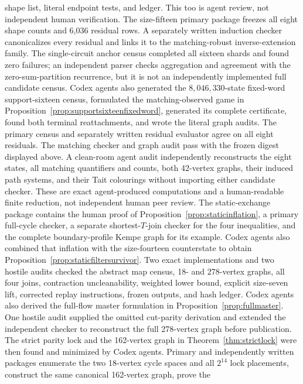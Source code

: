\documentclass[11pt]{article}
\theoremstyle{definition}
\theoremstyle{remark}
\begin{document}
shape list, literal endpoint tests, and ledger.  This too is agent
review, not independent human verification.  The
size-fifteen primary package freezes
all eight shape counts and 6,036 residual rows.  A separately written
induction checker canonicalizes every residual and links it to the
matching-robust inverse-extension family.  The single-circuit anchor
census completed all sixteen shards and found zero failures; an
independent parser checks aggregation and agreement with the
zero-sum-partition recurrence, but it is not an independently implemented
full candidate census.
Codex agents also generated the \(8{,}046{,}330\)-state fixed-word
support-sixteen census, formulated the matching-observed game in
Proposition~\ref{prop:supportsixteenfixedword}, generated its complete
certificate, found both terminal reattachments, and wrote the literal
graph audits.  The primary census and separately written residual
evaluator agree on all eight residuals.  The matching checker and graph
audit pass with the frozen digest displayed above.  A clean-room agent
audit independently reconstructs the eight states, all matching
quantifiers and counts, both 42-vertex graphs, their induced path systems,
and their Tait colourings without importing either candidate checker.
These are exact
agent-produced computations and a human-readable finite reduction, not
independent human peer review.
The static-exchange package contains the human proof of
Proposition~\ref{prop:staticinflation}, a primary full-cycle checker, a
separate shortest-\(T\)-join checker for the four inequalities, and the
complete boundary-profile Kempe graph for its example.
Codex agents also combined that inflation with the size-fourteen
counterstate to obtain Proposition~\ref{prop:staticfiltersurvivor}.
Two exact implementations and two hostile audits checked the abstract
map census, 18- and 278-vertex graphs, all four joins, contraction
uncleanability, weighted lower bound, explicit size-seven lift, corrected
replay instructions, frozen outputs, and hash ledger.
Codex agents also derived the full-flow master formulation in
Proposition~\ref{prop:fullmaster}.  One hostile audit supplied the omitted
cut-parity derivation and extended the independent checker to reconstruct
the full 278-vertex graph before publication.  The strict parity lock and
the 162-vertex graph in Theorem~\ref{thm:strictlock} were then found and
minimized by Codex agents.  Primary and independently written packages
enumerate the two 18-vertex cycle spaces and all \(2^{14}\) lock
placements, construct the same canonical 162-vertex graph, prove the
\end{document}
